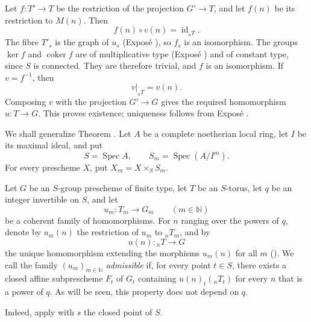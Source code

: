 Let \(f:T'\to T\) be the restriction of the projection \(G'\to T\),
and let \(f(n)\) be its restriction to \(M(n)\). Then
\[
  f(n)\circ v(n)=\operatorname{id}_{{}_nT}.
\]
The fibre \(T'_s\) is the graph of \(u_s\) (Exposé ), so
\(f_s\) is an isomorphism. The groups \(\ker f\) and
\(\operatorname{coker}f\) are of multiplicative type (Exposé )
and of constant type, since \(S\) is connected. They are therefore
trivial, and \(f\) is an isomorphism. If \(v=f^{-1}\), then
\[
  v|_{{}_nT}=v(n).
\]
Composing \(v\) with the projection \(G'\to G\) gives the required
homomorphism \(u:T\to G\). This proves existence; uniqueness follows
from Exposé .


We shall generalize Theorem . Let \(A\) be a complete
noetherian local ring, let \(I\) be its maximal ideal, and put
\[
  S=\operatorname{Spec}A,\qquad
  S_m=\operatorname{Spec}(A/I^m).
\]
For every prescheme \(X\), put \(X_m=X\times_SS_m\).

Let \(G\) be an \(S\)-group prescheme of finite type, let \(T\) be an
\(S\)-torus, let \(q\) be an integer invertible on \(S\), and let
\[
  u_m:T_m\longrightarrow G_m\qquad(m\in\mathbb N)
\]
be a coherent family of homomorphisms. For \(n\) ranging over the
powers of \(q\), denote by \(u_m(n)\) the restriction of \(u_m\) to
\({}_nT_m\), and by
\[
  u(n):{}_nT\longrightarrow G
\]
the unique homomorphism extending the morphisms \(u_m(n)\) for all
\(m\) (). We call the family \((u_m)_{m\in\mathbb N}\)
\emph{admissible} if, for every point \(t\in S\), there exists a
closed affine subprescheme \(F_t\) of \(G_t\) containing
\(u(n)_t({}_nT_t)\) for every \(n\) that is a power of \(q\). As will
be seen, this property does not depend on \(q\).


Indeed, apply  with \(s\) the closed point of \(S\).

